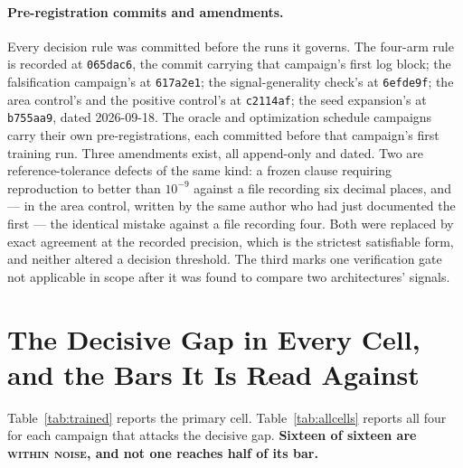 \documentclass{article}
\begin{document}
\paragraph{Pre-registration commits and amendments.} Every decision rule was committed before the
runs it governs. The four-arm rule is recorded at \texttt{065dac6}, the commit carrying that
campaign's first log block; the falsification campaign's at \texttt{617a2e1}; the signal-generality
check's at \texttt{6efde9f}; the area control's and the positive control's at \texttt{c2114af}; the
seed expansion's at \texttt{b755aa9}, dated 2026-09-18. The oracle and optimization schedule
campaigns carry their own pre-registrations, each committed before that campaign's first training
run. Three amendments exist, all append-only and dated. Two are reference-tolerance defects of the
same kind: a frozen clause requiring reproduction to better than $10^{-9}$ against a file recording
six decimal places, and --- in the area control, written by the same author who had just documented
the first --- the identical mistake against a file recording four. Both were replaced by exact
agreement at the recorded precision, which is the strictest satisfiable form, and neither altered a
decision threshold. The third marks one verification gate not applicable in scope after it was found
to compare two architectures' signals.


\section{The Decisive Gap in Every Cell, and the Bars It Is Read Against}
\label{app:diag}

Table~\ref{tab:trained} reports the primary cell. Table~\ref{tab:allcells} reports all four for
each campaign that attacks the decisive gap. \textbf{Sixteen of sixteen are \textsc{within noise},
and not one reaches half of its bar.}
\end{document}
